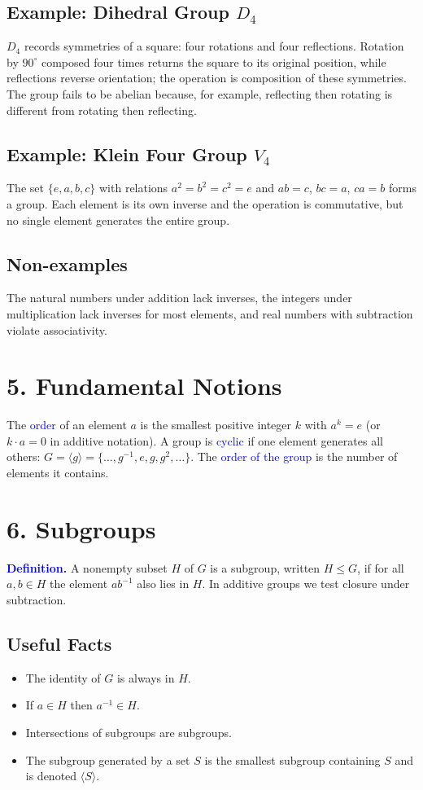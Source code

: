 \documentclass[12pt]{article}
\begin{document}
\subsection*{Example: Dihedral Group $D_4$}
$D_4$ records symmetries of a square: four rotations and four reflections.
Rotation by $90^{\circ}$ composed four times returns the square to its original position, while reflections reverse orientation; the operation is composition of these symmetries.
The group fails to be abelian because, for example, reflecting then rotating is different from rotating then reflecting.

\subsection*{Example: Klein Four Group $V_4$}
The set $\{e,a,b,c\}$ with relations $a^2=b^2=c^2=e$ and $ab=c$, $bc=a$, $ca=b$ forms a group.
Each element is its own inverse and the operation is commutative, but no single element generates the entire group.

\subsection*{Non-examples}
The natural numbers under addition lack inverses, the integers under multiplication lack inverses for most elements, and real numbers with subtraction violate associativity.

\section*{5. Fundamental Notions}
The \textcolor{blue}{order} of an element $a$ is the smallest positive integer $k$ with $a^k=e$ (or $k\cdot a=0$ in additive notation).
A group is \textcolor{blue}{cyclic} if one element generates all others: $G=\langle g\rangle=\{\ldots,g^{-1},e,g,g^{2},\ldots\}$.
The \textcolor{blue}{order of the group} is the number of elements it contains.

\section*{6. Subgroups}
\textcolor{blue}{\textbf{Definition.}} A nonempty subset $H$ of $G$ is a subgroup, written $H\leq G$, if for all $a,b\in H$ the element $ab^{-1}$ also lies in $H$.
In additive groups we test closure under subtraction.

\subsection*{Useful Facts}
\begin{itemize}
  \item The identity of $G$ is always in $H$.
  \item If $a\in H$ then $a^{-1}\in H$.
  \item Intersections of subgroups are subgroups.
  \item The subgroup generated by a set $S$ is the smallest subgroup containing $S$ and is denoted $\langle S\rangle$.
\end{itemize}
\end{document}
